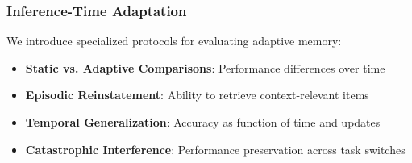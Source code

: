 \subsubsection{Inference-Time Adaptation}
We introduce specialized protocols for evaluating adaptive memory:
\begin{itemize}
\item \textbf{Static vs. Adaptive Comparisons}: Performance differences over time
\item \textbf{Episodic Reinstatement}: Ability to retrieve context-relevant items
\item \textbf{Temporal Generalization}: Accuracy as function of time and updates
\item \textbf{Catastrophic Interference}: Performance preservation across task switches
\end{itemize}
